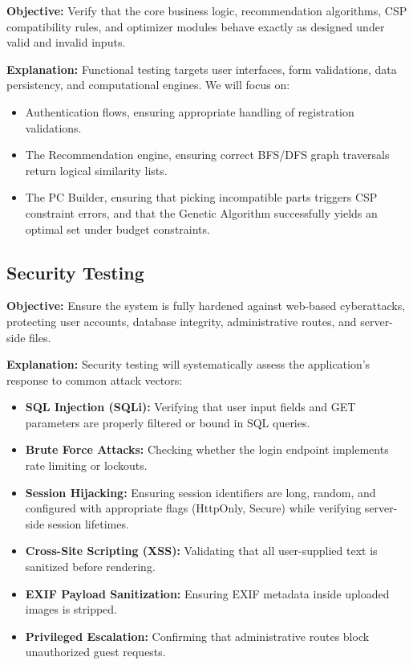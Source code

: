 \documentclass[12pt,a4paper]{article}
\begin{document}
\textbf{Objective:}
Verify that the core business logic, recommendation algorithms, CSP compatibility rules, and optimizer modules behave exactly as designed under valid and invalid inputs.

\textbf{Explanation:}
Functional testing targets user interfaces, form validations, data persistency, and computational engines. We will focus on:
\begin{itemize}
\item Authentication flows, ensuring appropriate handling of registration validations.
\item The Recommendation engine, ensuring correct BFS/DFS graph traversals return logical similarity lists.
\item The PC Builder, ensuring that picking incompatible parts triggers CSP constraint errors, and that the Genetic Algorithm successfully yields an optimal set under budget constraints.
\end{itemize}

\subsection{Security Testing}

\textbf{Objective:}
Ensure the system is fully hardened against web-based cyberattacks, protecting user accounts, database integrity, administrative routes, and server-side files.

\textbf{Explanation:}
Security testing will systematically assess the application's response to common attack vectors:
\begin{itemize}
\item \textbf{SQL Injection (SQLi):} Verifying that user input fields and GET parameters are properly filtered or bound in SQL queries.
\item \textbf{Brute Force Attacks:} Checking whether the login endpoint implements rate limiting or lockouts.
\item \textbf{Session Hijacking:} Ensuring session identifiers are long, random, and configured with appropriate flags (HttpOnly, Secure) while verifying server-side session lifetimes.
\item \textbf{Cross-Site Scripting (XSS):} Validating that all user-supplied text is sanitized before rendering.
\item \textbf{EXIF Payload Sanitization:} Ensuring EXIF metadata inside uploaded images is stripped.
\item \textbf{Privileged Escalation:} Confirming that administrative routes block unauthorized guest requests.
\end{itemize}
\end{document}
